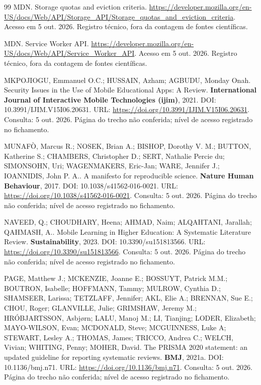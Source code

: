 \begin{thebibliography}{99}
 MDN. Storage quotas and eviction criteria. \url{https://developer.mozilla.org/en-US/docs/Web/API/Storage_API/Storage_quotas_and_eviction_criteria}. Acesso em 5 out. 2026. Registro técnico, fora da contagem de fontes científicas.

 MDN. Service Worker API. \url{https://developer.mozilla.org/en-US/docs/Web/API/Service_Worker_API}. Acesso em 5 out. 2026. Registro técnico, fora da contagem de fontes científicas.

 MKPOJIOGU, Emmanuel O.C.; HUSSAIN, Azham; AGBUDU, Monday Onah. Security Issues in the Use of Mobile Educational Apps: A Review. \textbf{International Journal of Interactive Mobile Technologies (ijim)}, 2021. DOI: 10.3991/IJIM.V15I06.20631. URL: \url{https://doi.org/10.3991/IJIM.V15I06.20631}. Consulta: 5 out. 2026. Página do trecho não conferida; nível de acesso registrado no fichamento.

 MUNAFÒ, Marcus R.; NOSEK, Brian A.; BISHOP, Dorothy V. M.; BUTTON, Katherine S.; CHAMBERS, Christopher D.; SERT, Nathalie Percie du; SIMONSOHN, Uri; WAGENMAKERS, Eric-Jan; WARE, Jennifer J.; IOANNIDIS, John P. A.. A manifesto for reproducible science. \textbf{Nature Human Behaviour}, 2017. DOI: 10.1038/s41562-016-0021. URL: \url{https://doi.org/10.1038/s41562-016-0021}. Consulta: 5 out. 2026. Página do trecho não conferida; nível de acesso registrado no fichamento.

 NAVEED, Q.; CHOUDHARY, Heena; AHMAD, Naim; ALQAHTANI, Jarallah; QAHMASH, A.. Mobile Learning in Higher Education: A Systematic Literature Review. \textbf{Sustainability}, 2023. DOI: 10.3390/su151813566. URL: \url{https://doi.org/10.3390/su151813566}. Consulta: 5 out. 2026. Página do trecho não conferida; nível de acesso registrado no fichamento.

 PAGE, Matthew J.; MCKENZIE, Joanne E.; BOSSUYT, Patrick M.M.; BOUTRON, Isabelle; HOFFMANN, Tammy; MULROW, Cynthia D.; SHAMSEER, Larissa; TETZLAFF, Jennifer; AKL, Elie A.; BRENNAN, Sue E.; CHOU, Roger; GLANVILLE, Julie; GRIMSHAW, Jeremy M.; HRÓBJARTSSON, Asbjørn; LALU, Manoj M.; LI, Tianjing; LODER, Elizabeth; MAYO-WILSON, Evan; MCDONALD, Steve; MCGUINNESS, Luke A; STEWART, Lesley A.; THOMAS, James; TRICCO, Andrea C.; WELCH, Vivian; WHITING, Penny; MOHER, David. The PRISMA 2020 statement: an updated guideline for reporting systematic reviews. \textbf{BMJ}, 2021a. DOI: 10.1136/bmj.n71. URL: \url{https://doi.org/10.1136/bmj.n71}. Consulta: 5 out. 2026. Página do trecho não conferida; nível de acesso registrado no fichamento.


\end{thebibliography}
